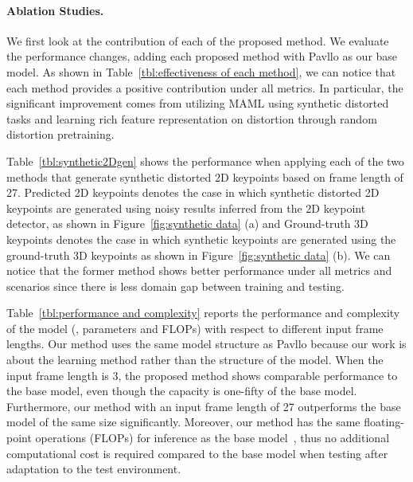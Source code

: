         \vspace{-4mm}
        \paragraph{Ablation Studies.}
            We first look at the contribution of each of the proposed method. We evaluate the performance changes, adding each proposed method with Pavllo \etal \cite{ref9_pavllo20193d} as our base model. As shown in Table~\ref{tbl:effectiveness of each method}, we can notice that each method provides a positive contribution under all metrics. In particular, the significant improvement comes from utilizing MAML using synthetic distorted tasks and learning rich feature representation on distortion through random distortion pretraining.
            
            Table~\ref{tbl:synthetic2Dgen} shows the performance when applying each of the two methods that generate synthetic distorted 2D keypoints based on frame length of 27. Predicted 2D keypoints denotes the case in which synthetic distorted 2D keypoints are generated using noisy results inferred from the 2D keypoint detector, as shown in Figure~\ref{fig:synthetic data} (a) and Ground-truth 3D keypoints denotes the case in which synthetic keypoints are generated using the ground-truth 3D keypoints as shown in Figure~\ref{fig:synthetic data} (b). We can notice that the former method shows better performance under all metrics and scenarios since there is less domain gap between training and testing.
            
            Table~\ref{tbl:performance and complexity} reports the performance and complexity of the model (\ie, parameters and FLOPs) with respect to different input frame lengths. Our method uses the same model structure as Pavllo \etal \cite{ref9_pavllo20193d} because our work is about the learning method rather than the structure of the model. When the input frame length is 3, the proposed method shows comparable performance to the base model, even though the capacity is one-fifty of the base model. Furthermore, our method with an input frame length of 27 outperforms the base model of the same size significantly. Moreover, our method has the same floating-point operations (FLOPs) for inference as the base model~\cite{ref9_pavllo20193d}, thus no additional computational cost is required compared to the base model when testing after adaptation to the test environment.

